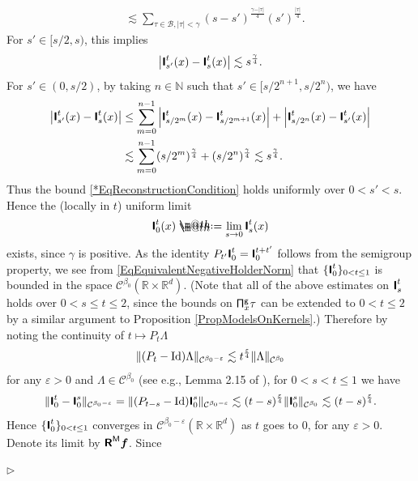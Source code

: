 \documentclass[10pt, reqno]{amsart}
\makeatletter
\numberwithin{subsection}{section}
\numberwithin{subsubsection}{subsection}
\numberwithin{equation}{section} %
\newenvironment{Dem}[1][\unskip]{%
    \begin{list}{\hspace{1.15cm}{\sf \textbf{{\small Proof #1 --}}}}{%
        \setlength{\topsep}{0pt}%
        \setlength{\leftmargin}{0pt}%
        \setlength{\rightmargin}{0pt}%
        \setlength{\listparindent}{0pt}%
        \setlength{\itemindent}{0pt}%
        \setlength{\parsep}{0pt}%
        \addtolength{\leftmargin}{0pt}%
        \addtolength{\rightmargin}{0pt}%
    } \item }{\hfill $\rhd$\end{list}\smallskip}
\theoremstyle{mystyle}
\theoremstyle{mystyle2}
\theoremstyle{mystyle3}
\newcommand{\iden}{\text{\rm Id}}
\newcommand{\bsf}{\boldsymbol{f}}
\renewcommand{\epsilon}{\varepsilon}
\newcommand\bbN{\mathbb{N}}
\newcommand\bbR{\mathbb{R}}
\newcommand{\mcB}{\mathcal{B}}
\newcommand{\mcC}{\mathcal{C}}
\newcommand*{\defeq}{\mathrel{\rlap{%
                     \raisebox{0.3ex}{$\m@th\cdot$}}%
                     \raisebox{-0.3ex}{$\m@th\cdot$}}%
                     =}
\makeatother
\begin{document}
\begin{Dem}
\begin{equation*}
\begin{split}
&\lesssim \sum_{\tau\in\mcB, \vert\tau\vert<\gamma} (s-s')^{\frac{\gamma-\vert\tau\vert}{4}} (s')^{\frac{\vert\tau\vert}{4}}.
\end{split}
\end{equation*}
For $s'\in[s/2,s)$, this implies
\begin{equation} \label{*EqReconstructionCondition}
\left\vert \textbf{\textsf{I}}_{s'}^t(x) - \textbf{\textsf{I}}_s^t(x) \right\vert 
\lesssim s^{\frac{\gamma}{4}}.
\end{equation}
For $s'\in(0,s/2)$, by taking $n\in\bbN$ such that $s'\in\big[s/2^{n+1},s/2^n\big)$, we have
\begin{align*}
\left\vert \textbf{\textsf{I}}_{s'}^t(x) - \textbf{\textsf{I}}_s^t(x) \right\vert 
&\le\sum_{m=0}^{n-1} \left\vert \textbf{\textsf{I}}_{s/2^m}^t(x) - \textbf{\textsf{I}}_{s/2^{m+1}}^t(x) \right\vert 
+\left\vert \textbf{\textsf{I}}_{s/2^n}^t(x) - \textbf{\textsf{I}}_{s'}^t(x) \right\vert \\
&\lesssim \sum_{m=0}^{n-1}(s/2^m)^{\frac{\gamma}{4}}+(s/2^n)^{\frac{\gamma}{4}}
\lesssim s^{\frac{\gamma}{4}}.
\end{align*}
Thus the bound \eqref{*EqReconstructionCondition} holds uniformly over $0<s'<s$. Hence the (locally in $t$) uniform limit
$$
\textbf{\textsf{I}}_0^t(x) \defeq 
\underset{s\rightarrow 0}{\lim}\, \textbf{\textsf{I}}_s^t(x)
$$
exists, since $\gamma$ is positive. As the identity $P_{t'}\textbf{\textsf{I}}_0^t=\textbf{\textsf{I}}_0^{t+t'}$ follows from the semigroup property, we see from \eqref{EqEquivalentNegativeHolderNorm} that $\{\textbf{\textsf{I}}_0^t\}_{0<t\le1}$ is bounded in the space $\mcC^{\beta_0}(\bbR\times\bbR^d)$. (Note that all of the above estimates on $\textbf{\textsf{I}}_s^t$ holds over $0<s\le t\le2$, since the bounds on ${\sf\Pi}_x^{\sf g}\tau$ can be extended to $0<t\le2$ by a similar argument to Proposition \ref{PropModelsOnKernels}.) Therefore by noting the continuity of $t\mapsto P_t\Lambda$
$$
\|(P_t-\iden)\Lambda\|_{\mcC^{\beta_0-\varepsilon}}\lesssim t^{\frac\varepsilon4}\|\Lambda\|_{\mcC^{\beta_0}}
$$
for any $\varepsilon>0$ and $\Lambda\in\mcC^{\beta_0}$ (see e.g., Lemma 2.15 of \cite{Hos23}), for $0<s<t\le1$ we have
$$
\|\textbf{\textsf{I}}_0^t-\textbf{\textsf{I}}_0^s\|_{\mcC^{\beta_0-\varepsilon}}
=\|(P_{t-s}-\iden)\textbf{\textsf{I}}_0^s\|_{\mcC^{\beta_0-\varepsilon}}
\lesssim (t-s)^{\frac{\varepsilon}4}\|\textbf{\textsf{I}}_0^s\|_{\mcC^{\beta_0}}\lesssim (t-s)^{\frac\varepsilon4}.
$$
Hence $\{\textbf{\textsf{I}}_0^t\}_{0<t\le1}$ converges in $\mcC^{\beta_0-\epsilon}(\bbR\times\bbR^d)$ as $t$ goes to $0$, for any $\epsilon>0$. Denote its limit by $\textbf{\textsf{R}}^{\sf M}\bsf$. Since

\end{Dem}
\end{document}
